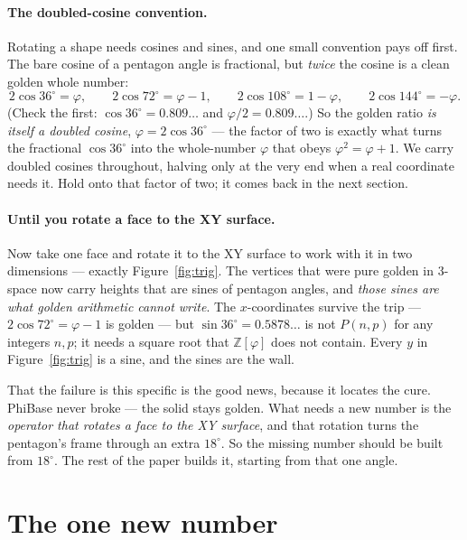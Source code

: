 \documentclass[11pt]{article}
\newcommand{\phigr}{\varphi}
\begin{document}
\paragraph{The doubled-cosine convention.} Rotating a shape needs cosines and sines, and one small
convention pays off first. The bare cosine of a pentagon angle is fractional, but \emph{twice} the cosine
is a clean golden whole number:
\[
2\cos 36^\circ = \phigr, \qquad 2\cos 72^\circ = \phigr - 1, \qquad 2\cos 108^\circ = 1 - \phigr,
\qquad 2\cos 144^\circ = -\phigr.
\]
(Check the first: $\cos 36^\circ = 0.809\ldots$ and $\phigr/2 = 0.809\ldots$.) So the golden ratio
\emph{is itself a doubled cosine}, $\phigr = 2\cos 36^\circ$ --- the factor of two is exactly what turns
the fractional $\cos 36^\circ$ into the whole-number $\phigr$ that obeys $\phigr^2 = \phigr + 1$. We carry
doubled cosines throughout, halving only at the very end when a real coordinate needs it. Hold onto that
factor of two; it comes back in the next section.

\paragraph{Until you rotate a face to the XY surface.} Now take one face and rotate it to the XY surface
to work with it in two dimensions --- exactly Figure~\ref{fig:trig}. The vertices that were pure golden in
3-space now carry heights that are sines of pentagon angles, and \emph{those sines are what golden
arithmetic cannot write}. The $x$-coordinates survive the trip --- $2\cos 72^\circ = \phigr - 1$ is
golden --- but $\sin 36^\circ = 0.5878\ldots$ is not $P(n,p)$ for any integers $n,p$; it needs a square
root that $\mathbb{Z}[\phigr]$ does not contain. Every $y$ in Figure~\ref{fig:trig} is a sine, and the
sines are the wall.

That the failure is this specific is the good news, because it locates the cure. PhiBase never broke ---
the solid stays golden. What needs a new number is the \emph{operator that rotates a face to the XY
surface}, and that rotation turns the pentagon's frame through an extra $18^\circ$. So the missing number
should be built from $18^\circ$. The rest of the paper builds it, starting from that one angle.

\section{The one new number}
\end{document}
